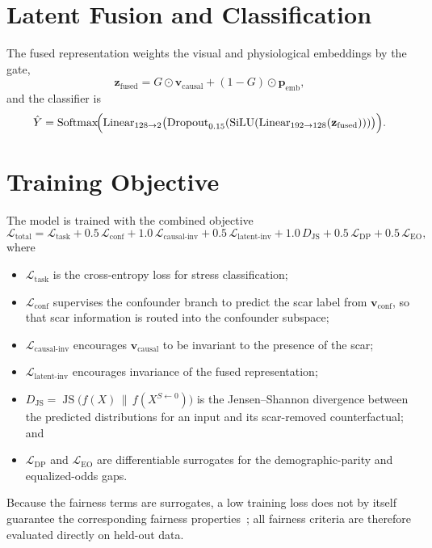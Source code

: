 \section{Latent Fusion and Classification}
The fused representation weights the visual and physiological embeddings by the gate,
\begin{equation}
\mathbf{z}_{\text{fused}} = G \odot \mathbf{v}_{\text{causal}} + (1 - G) \odot \mathbf{p}_{\text{emb}},
\end{equation}
and the classifier is
\begin{equation}
\hat{Y} = \operatorname{Softmax}\!\Bigl(\operatorname{Linear}_{128 \to 2}\bigl(\operatorname{Dropout}_{0.15}(\operatorname{SiLU}(\operatorname{Linear}_{192 \to 128}(\mathbf{z}_{\text{fused}})))\bigr)\Bigr).
\end{equation}

\section{Training Objective}
\label{sec:loss}
The model is trained with the combined objective
\begin{equation}
\mathcal{L}_{\text{total}} = \mathcal{L}_{\text{task}} + 0.5\,\mathcal{L}_{\text{conf}} + 1.0\,\mathcal{L}_{\text{causal-inv}} + 0.5\,\mathcal{L}_{\text{latent-inv}} + 1.0\,D_{\text{JS}} + 0.5\,\mathcal{L}_{\text{DP}} + 0.5\,\mathcal{L}_{\text{EO}},
\end{equation}
where
\begin{itemize}
    \item $\mathcal{L}_{\text{task}}$ is the cross-entropy loss for stress classification;
    \item $\mathcal{L}_{\text{conf}}$ supervises the confounder branch to predict the scar label from $\mathbf{v}_{\text{conf}}$, so that scar information is routed into the confounder subspace;
    \item $\mathcal{L}_{\text{causal-inv}}$ encourages $\mathbf{v}_{\text{causal}}$ to be invariant to the presence of the scar;
    \item $\mathcal{L}_{\text{latent-inv}}$ encourages invariance of the fused representation;
    \item $D_{\text{JS}} = \operatorname{JS}\bigl(f(X) \,\|\, f(X^{S \leftarrow 0})\bigr)$ is the Jensen--Shannon divergence between the predicted distributions for an input and its scar-removed counterfactual; and
    \item $\mathcal{L}_{\text{DP}}$ and $\mathcal{L}_{\text{EO}}$ are differentiable surrogates for the demographic-parity and equalized-odds gaps.
\end{itemize}
Because the fairness terms are surrogates, a low training loss does not by itself guarantee the corresponding fairness properties~\cite{yao2024}; all fairness criteria are therefore evaluated directly on held-out data.

